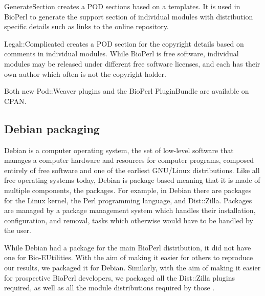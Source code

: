 GenerateSection creates a POD sections based on a templates.  It is
used in BioPerl to generate the support section of individual modules
with distribution specific details such as links to the online
repository.

Legal::Complicated creates a POD section for the copyright details
based on comments in individual modules.  While BioPerl is free
software, individual modules may be released under different free
software licenses, and each has their own author which often is not
the copyright holder.

Both new Pod::Weaver plugins and the BioPerl PluginBundle are available
on CPAN.

\subsection{Debian packaging}

Debian is a computer operating system, the set of low-level software
that manages a computer hardware and resources for computer programs,
composed entirely of free software and one of the earliest GNU/Linux
distributions.  Like all free operating systems today, Debian is
package based meaning that it is made of multiple components, the
packages.  For example, in Debian there are packages for the Linux
kernel, the Perl programming language, and Dist::Zilla.  Packages are
managed by a package management system which handles their
installation, configuration, and removal, tasks which otherwise would
have to be handled by the user.

While Debian had a package for the main BioPerl distribution, it did
not have one for Bio-EUtilities.  With the aim of making it easier for
others to reproduce our results, we packaged it for Debian.
Similarly, with the aim of making it easier for prospective BioPerl
developers, we packaged all the Dist::Zilla plugins required, as well
as all the module distributions required by those
.

